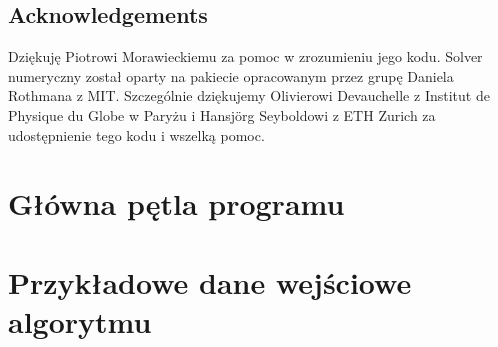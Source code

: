 \documentclass[]{pracamgr}
\begin{document}
  \section*{Acknowledgements}
    Dziękuję Piotrowi Morawieckiemu za pomoc w zrozumieniu jego kodu. Solver numeryczny został oparty na pakiecie opracowanym przez grupę Daniela Rothmana z MIT. Szczególnie dziękujemy Olivierowi Devauchelle z Institut de Physique du Globe w Paryżu i Hansj\"{o}rg Seyboldowi z ETH Zurich za udostępnienie tego kodu i wszelką pomoc.

  

  \appendix

  \chapter{Główna pętla programu}

  \chapter{Przykładowe dane wejściowe algorytmu}
\end{document}
